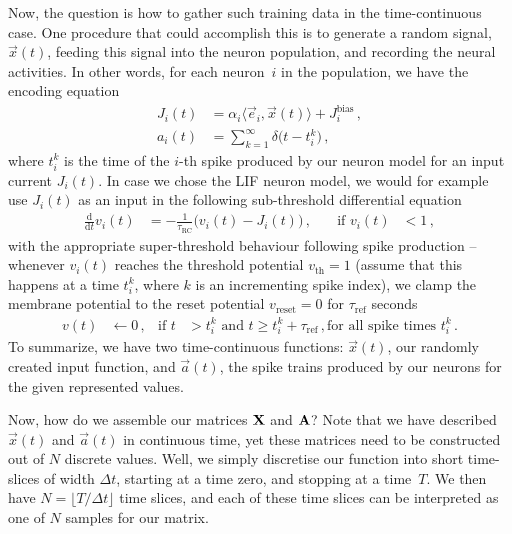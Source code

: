 \documentclass[10pt,letterpaper,oneside]{article}
\begin{document}
Now, the question is how to gather such training data in the time-continuous case. One procedure that could accomplish this is to generate a random signal, $\vec x(t)$, feeding this signal into the neuron population, and recording the neural activities. In other words, for each neuron~$i$ in the population, we have the encoding equation
\begin{align*}
J_i(t) &= \alpha_i \langle \vec e_i, \vec x(t) \rangle + J^\mathrm{bias}_i \,, \\
a_i(t) &= \sum_{k=1}^\infty \delta\big(t - t^k_i\big) \,,
\end{align*}
where $t^k_i$ is the time of the $i$-th spike produced by our neuron model for an input current $J_i(t)$. In case we chose the LIF neuron model, we would for example use $J_i(t)$ as an input in the following sub-threshold differential equation
\begin{align*}
\frac{\mathrm{d}}{\mathrm{d}t} v_i(t) &= -\frac{1}{\tau_\mathrm{RC}} \big( v_i(t) - J_i(t) \big) \,, \quad &\text{if } v_i(t) &< 1\,,
\end{align*}
with the appropriate super-threshold behaviour following spike production -- whenever $v_i(t)$ reaches the threshold potential $v_\mathrm{th} = 1$ (assume that this happens at a time $t_i^k$, where $k$ is an incrementing spike index), we clamp the membrane potential to the reset potential $v_\mathrm{reset} = 0$ for $\tau_\mathrm{ref}$ seconds
\begin{align*}
v(t) &\gets 0 \,, &\text{if } t &> t_i^k \text{ and } t \geq t_i^k + \tau_\mathrm{ref} \,, \text{for all spike times } t_i^k \,.
\end{align*}
To summarize, we have two time-continuous functions: $\vec x(t)$, our randomly created input function, and $\vec a(t)$, the spike trains produced by our neurons for the given represented values.

Now, how do we assemble our matrices ${\mathbf{X}}$ and ${\mathbf{A}}$? Note that we have described $\vec x(t)$ and $\vec a(t)$ in continuous time, yet these matrices need to be constructed out of $N$ discrete values. Well, we simply discretise our function into short time-slices of width $\Delta t$, starting at a time zero, and stopping at a time~$T$. We then have $N = \lfloor T / \Delta t \rfloor$ time slices, and each of these time slices can be interpreted as one of $N$ samples for our matrix.
\end{document}
